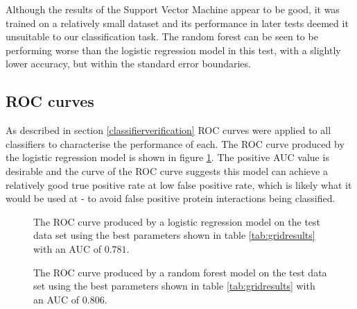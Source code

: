 Although the results of the Support Vector Machine appear to be good, it was trained on a relatively small dataset and its performance in later tests deemed it unsuitable to our classification task.
The random forest can be seen to be performing worse than the logistic regression model in this test, with a slightly lower accuracy, but within the standard error boundaries.

\subsection{ROC curves}

As described in section \ref{classifierverification} ROC curves were applied to all classifiers to characterise the performance of each.
The ROC curve produced by the logistic regression model is shown in figure \ref{fig:logroc}.
The positive AUC value is desirable and the curve of the ROC curve suggests this model can achieve a relatively good true positive rate at low false positive rate, which is likely what it would be used at - to avoid false positive protein interactions being classified.

\begin{figure}
    \centering
    \setlength\figureheight{3in}
    \setlength\figurewidth{4in}
    \caption{The ROC curve produced by a logistic regression model on the test data set using the best parameters shown in table \ref{tab:gridresults} with an AUC of $0.781$.}
    \label{fig:logroc}
\end{figure}

\begin{figure}
    \centering
    \setlength\figureheight{3in}
    \setlength\figurewidth{4in}
    \caption{The ROC curve produced by a random forest model on the test data set using the best parameters shown in table \ref{tab:gridresults} with an AUC of $0.806$.}
    \label{fig:rfroc}
\end{figure}


